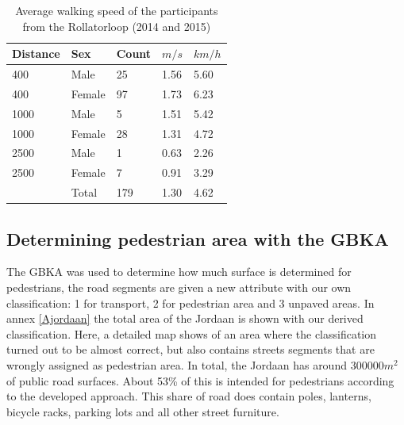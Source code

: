 \begin{table}[h]
\caption{Average walking speed of the participants from the Rollatorloop (2014 and 2015) \label{statistiswalkingspeed}}
\centering
\begin{tabular}{|p{70pt}|p{70pt}|p{70pt}|p{70pt}|p{70pt}|}
\hline
Distance & Sex & Count & $m/s$ & $km/h$ \\
\hline
400 & Male	 & 25	& 1.56 & 5.60 \\
400 & Female & 97	& 1.73 & 6.23 \\
\hline
1000 & Male		& 5	 & 1.51	 & 5.42\\
1000 & Female	& 28 & 	1.31 & 4.72\\
\hline
2500 & Male		& 1	 & 0.63	 & 2.26\\
2500 & Female	& 7	 & 0.91	 & 3.29\\
\hline
& Total & 179 & 1.30 & 4.62 \\
\hline
\end{tabular}
\end{table}


\subsection{Determining pedestrian area with the GBKA}
The GBKA was used to determine how much surface is determined for pedestrians, the road segments are given a new attribute with our own classification: 1 for transport, 2 for pedestrian area and 3 unpaved areas. In annex \ref{Ajordaan} the total area of the Jordaan is shown with our derived classification. Here, a detailed map shows of an area where the classification turned out to be almost correct, but also contains streets segments that are wrongly assigned as pedestrian area. In total, the Jordaan has around 300000$m^2$ of public road surfaces. About 53\% of this is intended for pedestrians according to the developed approach. This share of road does contain poles, lanterns, bicycle racks, parking lots and all other street furniture. 

